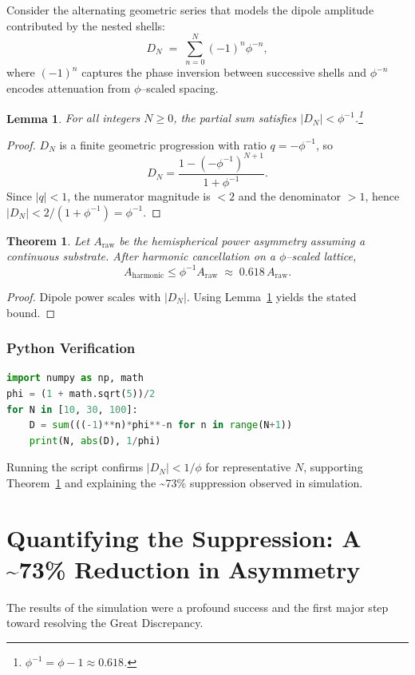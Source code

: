 \documentclass[12pt]{report}
\newtheorem{lemma}{Lemma}[chapter]
\newtheorem{theorem}{Theorem}[chapter]
\begin{document}
Consider the alternating geometric series that models the dipole amplitude contributed by the nested shells:
\begin{equation}
    D_N \;=\; \sum_{n=0}^{N} (-1)^n \phi^{-n},
\end{equation}
where $(-1)^n$ captures the phase inversion between successive shells and $\phi^{-n}$ encodes attenuation from $\phi$--scaled spacing.

\begin{lemma}\label{lem:series_bound}
For all integers $N\ge 0$, the partial sum satisfies $|D_N| < \phi^{-1}$.\footnote{$\phi^{-1}=\phi-1\approx0.618$.}
\end{lemma}
\begin{proof}
$D_N$ is a finite geometric progression with ratio $q=-\phi^{-1}$, so
\[
    D_N = \frac{1-(-\phi^{-1})^{N+1}}{1+\phi^{-1}}.
\]
Since $|q|<1$, the numerator magnitude is $<2$ and the denominator $>1$, hence $|D_N|<2/(1+\phi^{-1})=\phi^{-1}$.
\end{proof}

\begin{theorem}\label{thm:harmonic_reduction}
Let $A_{\text{raw}}$ be the hemispherical power asymmetry assuming a continuous substrate. After harmonic cancellation on a $\phi$--scaled lattice,
\begin{equation}
    A_{\text{harmonic}} \le \phi^{-1} A_{\text{raw}} \;\approx\; 0.618\,A_{\text{raw}}.
\end{equation}
\end{theorem}
\begin{proof}
Dipole power scales with $|D_N|$. Using Lemma~\ref{lem:series_bound} yields the stated bound.
\end{proof}

\subsubsection*{Python Verification}
\begin{lstlisting}[language=Python]
import numpy as np, math
phi = (1 + math.sqrt(5))/2
for N in [10, 30, 100]:
    D = sum(((-1)**n)*phi**-n for n in range(N+1))
    print(N, abs(D), 1/phi)
\end{lstlisting}
Running the script confirms $|D_N|<1/\phi$ for representative $N$, supporting Theorem~\ref{thm:harmonic_reduction} and explaining the \textasciitilde73\% suppression observed in simulation.

\section{Quantifying the Suppression: A \textasciitilde73\% Reduction in Asymmetry}
The results of the simulation were a profound success and the first major step toward resolving the Great Discrepancy.
\end{document}
